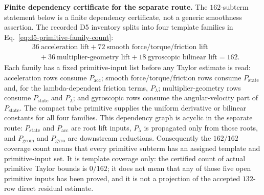 \documentclass[preprint,12pt]{elsarticle}
\begin{document}
\noindent\textbf{Finite dependency certificate for the separate route.}
The \(162\)-subterm statement below is a finite dependency certificate, not a
generic smoothness assertion.  The recorded D5 inventory splits into four
template families in Eq.~\eqref{eq:d5-primitive-family-count}:
\begin{equation}
\label{eq:d5-primitive-family-count}
\begin{aligned}
&36\ \text{acceleration lift}
 +72\ \text{smooth force/torque/friction lift}\\
&\quad
 +36\ \text{multiplier-geometry lift}
 +18\ \text{gyroscopic bilinear lift}
 =162 .
\end{aligned}
\end{equation}
Each family has a fixed primitive-input list before any Taylor estimate is
read: acceleration rows consume \(P_{\mathrm{acc}}\); smooth
force/torque/friction rows consume \(P_{\mathrm{state}}\) and, for the
lambda-dependent friction terms, \(P_{\lambda}\); multiplier-geometry rows
consume \(P_{\mathrm{state}}\) and \(P_{\lambda}\); and gyroscopic rows
consume the angular-velocity part of \(P_{\mathrm{state}}\).  The compact
tube primitive supplies the uniform derivative or bilinear constants for all
four families.  This dependency graph is acyclic in the separate route:
\(P_{\mathrm{state}}\) and \(P_{\mathrm{acc}}\) are root lift inputs,
\(P_{\lambda}\) is propagated only from those roots, and
\(P_{\mathrm{geom}}\) and \(P_{\mathrm{gyro}}\) are downstream reductions.
Consequently the \(162/162\) coverage count means that every primitive
subterm has an assigned template and primitive-input set. It is template
coverage only: the certified count of actual primitive Taylor bounds is \(0/162\); it
does not mean that any of those five open primitive inputs has been proved,
and it is not a projection of the accepted \(132\)-row direct residual
estimate.
\end{document}
